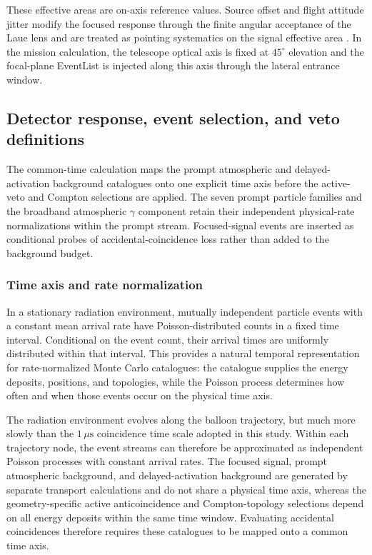 \documentclass[11pt]{article}
\begin{document}
These effective areas are on-axis reference values. Source offset and flight
attitude jitter modify the focused response through the finite angular acceptance
of the Laue lens and are treated as pointing systematics on the signal effective
area \cite{Barriere2009Laue,Weidenspointner2006MAX}. In the mission calculation,
the telescope optical axis is fixed at $45^\circ$ elevation and the focal-plane
EventList is injected along this axis through the lateral entrance window.

\subsection{Detector response, event selection, and veto definitions}
\label{sec:selection}

The common-time calculation maps the prompt atmospheric and delayed-activation
background catalogues onto one explicit time axis before the active-veto and
Compton selections are applied. The seven prompt particle families and the
broadband atmospheric $\gamma$ component retain their independent physical-rate
normalizations within the prompt stream. Focused-signal events are inserted as
conditional probes of accidental-coincidence loss rather than added to the
background budget.

\subsubsection{Time axis and rate normalization}
\label{subsec:time_axis}

In a stationary radiation environment, mutually independent particle events
with a constant mean arrival rate have Poisson-distributed counts in a fixed
time interval. Conditional on the event count, their arrival times are
uniformly distributed within that interval. This provides a natural temporal
representation for rate-normalized Monte Carlo catalogues: the catalogue
supplies the energy deposits, positions, and topologies, while the Poisson
process determines how often and when those events occur on the physical time
axis.

The radiation environment evolves along the balloon trajectory, but much more
slowly than the $1\,\mu\mathrm{s}$ coincidence time scale adopted in this study.
Within each trajectory node, the event streams can therefore be approximated as
independent Poisson processes with constant arrival rates. The focused signal,
prompt atmospheric background, and delayed-activation background are generated
by separate transport calculations and do not share a physical time axis,
whereas the geometry-specific active anticoincidence and Compton-topology selections depend on all
energy deposits within the same time window. Evaluating accidental coincidences
therefore requires these catalogues to be mapped onto a common time axis.
\end{document}
